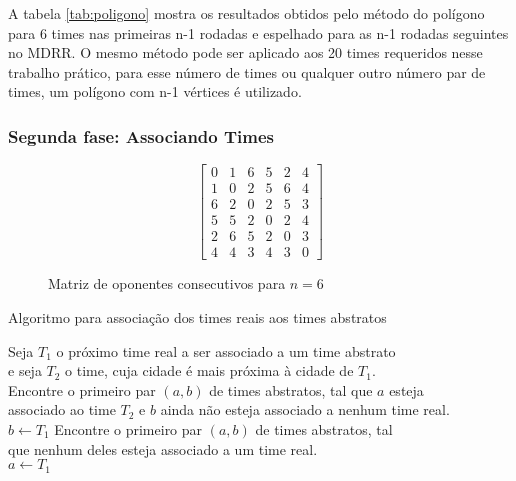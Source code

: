 \documentclass[12pt,a4paper]{article}
\makeatletter
\newcommand{\algorithmfootnote}[2][\footnotesize]{%
	\let\old@algocf@finish\@algocf@finish%
	\def\@algocf@finish{\old@algocf@finish%
		\leavevmode\rlap{\begin{minipage}{\linewidth}
				#1#2
		\end{minipage}}%
	}%
}
\makeatother
\begin{document}
A tabela \ref{tab:poligono} mostra os resultados obtidos pelo método do polígono para $6$ times nas primeiras n-1 rodadas e espelhado para as n-1 rodadas seguintes no MDRR. O mesmo método pode ser aplicado aos 20 times requeridos nesse trabalho prático, para esse número de times ou qualquer outro número par de times, um polígono com n-1 vértices é utilizado.

\subsubsection{Segunda fase: Associando Times}

\begin{figure}[H]
	\caption{Matriz de oponentes consecutivos para $n=6$}
	\label{matriz:consecutivos}
	\[ \begin{bmatrix}
	0 & 1 & 6 & 5 & 2 & 4 \\
	1 & 0 & 2 & 5 & 6 & 4 \\
	6 & 2 & 0 & 2 & 5 & 3 \\
	5 & 5 & 2 & 0 & 2 & 4 \\
	2 & 6 & 5 & 2 & 0 & 3 \\
	4 & 4 & 3 & 4 & 3 & 0
	\end{bmatrix} \]
\end{figure}



\begin{algorithm}
	\caption{Algoritmo para associação dos times reais aos times abstratos}
	\algorithmfootnote{Fonte: \Citeauthor{marcio:jogos} \Citep{marcio:jogos}}
	\label{associa}
	 {
		Seja $T_{1}$ o próximo time real a ser associado a um time abstrato\\
		e seja $T_{2}$ o time, cuja cidade é mais próxima à cidade de $T_{1}$.\\
		 {
			Encontre o primeiro par $(a,b)$ de times abstratos, tal que $a$ esteja\\
			associado ao time $T_{2}$ e $b$ ainda não esteja associado a nenhum time real.\\
			$b \leftarrow T_{1}$ }
			{ Encontre o primeiro par $(a,b)$ de times abstratos, tal\\
			que nenhum deles esteja associado a um time real.\\
			$a \leftarrow T_{1}$ } }
\end{algorithm}
\end{document}
